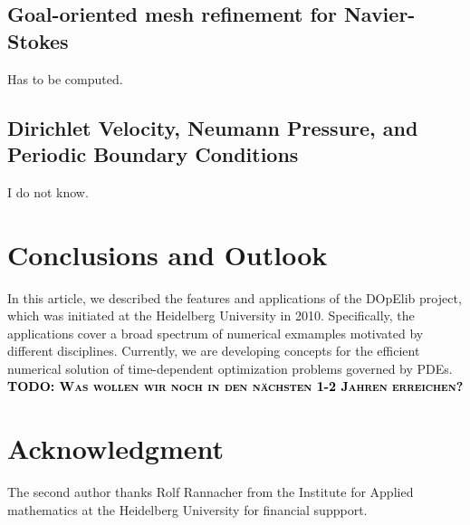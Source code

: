 \documentclass[prodmode,acmtoms]{acmsmall}
\numberwithin{equation}{section}
\newcommand{\todo}[1]{\textbf{\textsc{\textcolor{black}{TODO: #1}}}}
\begin{document}
\subsection{Goal-oriented mesh refinement for Navier-Stokes}
Has to be computed.

\subsection{Dirichlet Velocity, Neumann Pressure, and
Periodic Boundary Conditions}
I do not know.

\section{Conclusions and Outlook}
\label{conclusions}
In this article, we described the features 
and applications of the DOpElib project, which 
was initiated at the Heidelberg University in 2010.
Specifically, the applications cover a broad 
spectrum of numerical exmamples motivated 
by different disciplines. 
Currently, we are developing concepts for the efficient 
numerical solution of time-dependent optimization
problems governed by PDEs. 
\todo{Was wollen wir noch in den nächsten 1-2 Jahren erreichen?}



\section*{Acknowledgment}
The second author thanks Rolf Rannacher from
the Institute for Applied mathematics at the 
Heidelberg University for financial suppport. 




%


%
\end{document}
